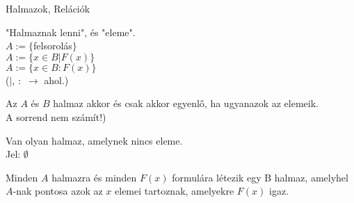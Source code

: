 

\begin{frame}[plain]
\begin{tcolorbox}[center, colback={myyellow}, coltext={black}, colframe={myyellow}]
    {\Huge Halmazok, Relációk}
    \mmedskip
\end{tcolorbox}
\end{frame}

\begin{frame}
  \begin{tcolorbox}[title={Def.: A halmazelmélet "Definiálatlan alapfogalmai"}]
    "Halmaznak lenni", és "eleme".\\
    $A := \{$felsorolás$\}$\\
    $A := \{ x \in B | F(x) \}$\\
    $A := \{ x \in B : F(x) \}$\\
    {\footnotesize ($|$, $:$ $\rightarrow$ ahol.)}
  \end{tcolorbox}

  \begin{tcolorbox}[title={Def.:  Meghatározottsági Axióma (Halmazok egyenlősége)}]
    Az $A$ és $B$ halmaz akkor és csak akkor egyenlő, ha ugyanazok az elemeik.\\
    {\footnotesize A sorrend nem számít!)}
  \end{tcolorbox}

  \begin{tcolorbox}[title={Def.: Az üres halaz axiómája}]
    Van olyan halmaz, amelynek nincs eleme.\\
    Jel: $\emptyset$
  \end{tcolorbox}

  \begin{tcolorbox}[title={Def.: Részhalmaz-axióma}]
    Minden $A$ halmazra és minden $F(x)$ formulára létezik egy B halmaz, amelyhel $A$-nak pontosa azok az $x$ elemei tartoznak, amelyekre $F(x)$ igaz.
  \end{tcolorbox}
\end{frame}

